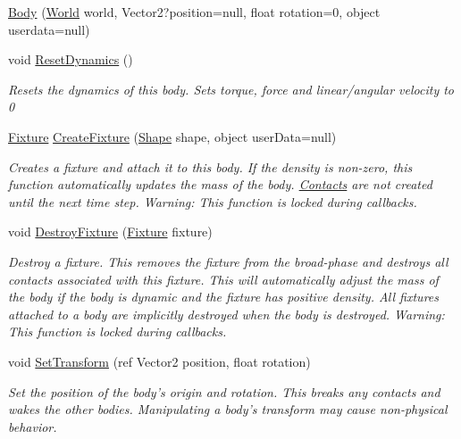 \begin{DoxyCompactItemize}
\item 
\hyperlink{class_farseer_physics_1_1_dynamics_1_1_body_af82f95f1db9636a2ecdfe6548e263c38}{Body} (\hyperlink{class_farseer_physics_1_1_dynamics_1_1_world}{World} world, Vector2?position=null, float rotation=0, object userdata=null)
\item 
void \hyperlink{class_farseer_physics_1_1_dynamics_1_1_body_af3f46e0c02f96a0bf3b170dadb425421}{Reset\+Dynamics} ()
\begin{DoxyCompactList}\small\item\em Resets the dynamics of this body. Sets torque, force and linear/angular velocity to 0 \end{DoxyCompactList}\item 
\hyperlink{class_farseer_physics_1_1_dynamics_1_1_fixture}{Fixture} \hyperlink{class_farseer_physics_1_1_dynamics_1_1_body_af7fe516c55d961070fdde4f3b280e771}{Create\+Fixture} (\hyperlink{class_farseer_physics_1_1_collision_1_1_shapes_1_1_shape}{Shape} shape, object user\+Data=null)
\begin{DoxyCompactList}\small\item\em Creates a fixture and attach it to this body. If the density is non-\/zero, this function automatically updates the mass of the body. \hyperlink{namespace_farseer_physics_1_1_dynamics_1_1_contacts}{Contacts} are not created until the next time step. Warning\+: This function is locked during callbacks. \end{DoxyCompactList}\item 
void \hyperlink{class_farseer_physics_1_1_dynamics_1_1_body_ad4964c5a47c1dc019be441521dc26a94}{Destroy\+Fixture} (\hyperlink{class_farseer_physics_1_1_dynamics_1_1_fixture}{Fixture} fixture)
\begin{DoxyCompactList}\small\item\em Destroy a fixture. This removes the fixture from the broad-\/phase and destroys all contacts associated with this fixture. This will automatically adjust the mass of the body if the body is dynamic and the fixture has positive density. All fixtures attached to a body are implicitly destroyed when the body is destroyed. Warning\+: This function is locked during callbacks. \end{DoxyCompactList}\item 
void \hyperlink{class_farseer_physics_1_1_dynamics_1_1_body_a9f82d77545815e06d348e175d6961a99}{Set\+Transform} (ref Vector2 position, float rotation)
\begin{DoxyCompactList}\small\item\em Set the position of the body's origin and rotation. This breaks any contacts and wakes the other bodies. Manipulating a body's transform may cause non-\/physical behavior. \end{DoxyCompactList}\item 

\end{DoxyCompactItemize}
